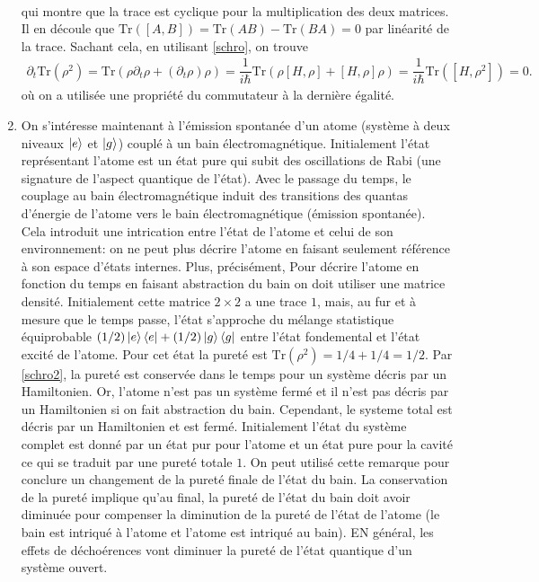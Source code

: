 \begin{enumerate}
\begin{align}
    \end{align}
    qui montre que la trace est cyclique pour la multiplication des deux matrices. Il en découle que $\text{Tr}([A, B]) = \text{Tr}(AB) - \text{Tr}(BA) = 0$ par linéarité de la trace. Sachant cela, en utilisant \eqref{schro}, on trouve 
    \begin{align}
         \partial_t \text{Tr}(\rho^2) = \text{Tr}\left(\rho \partial_t\rho + (\partial_t \rho) \rho\right)= \dfrac{1}{i\hbar}\text{Tr}\left(\rho[H, \rho]  + [H, \rho] \rho\right) = \dfrac{1}{i\hbar}\text{Tr}\left([H, \rho^2]\right) = 0. \label{schro2}
    \end{align}
    où on a utilisée une propriété du commutateur à la dernière égalité.
      
    \item On s'intéresse maintenant à l'émission spontanée d'un atome (système à deux niveaux $\ket{e}$ et $\ket{g}$) couplé à un bain électromagnétique. Initialement l'état représentant l'atome est un état pure qui subit des oscillations de Rabi (une signature de l'aspect quantique de l'état). Avec le passage du temps, le couplage au bain électromagnétique induit des transitions des quantas d'énergie de l'atome vers le bain électromagnétique (émission spontanée). Cela introduit une intrication entre l'état de l'atome et celui de son environnement: on ne peut plus décrire l'atome en faisant seulement référence à son espace d'états internes. Plus, précisément, Pour décrire l'atome en fonction du temps en faisant abstraction du bain on doit utiliser une matrice densité. Initialement cette matrice $2\times2$ a une trace $1$, mais, au fur et à mesure que le temps passe, l'état s'approche du mélange statistique équiprobable $(1/2)\ket{e}\bra{e}+(1/2)\ket{g}\bra{g}$ entre l'état fondemental et l'état excité de l'atome. Pour cet état la pureté est $\text{Tr}(\rho^2)=1/4 + 1/4 = 1/2$. Par \eqref{schro2}, la pureté est conservée dans le temps pour un système décris par un Hamiltonien. Or, l'atome n'est pas un système fermé et il n'est pas décris par un Hamiltonien si on fait abstraction du bain. Cependant, le systeme total est décris par un Hamiltonien et est fermé.  Initialement l'état du système complet est donné par un état pur pour l'atome et un état pure pour la cavité ce qui se traduit par une pureté totale $1$. On peut utilisé cette remarque pour conclure un changement de la pureté finale de l'état du bain. La conservation de la pureté implique qu'au final, la pureté de l'état du bain doit avoir diminuée pour compenser la diminution de la pureté de l'état de l'atome (le bain est intriqué à l'atome et l'atome est intriqué au bain). EN général, les effets de déchoérences vont diminuer la pureté de l'état quantique d'un système ouvert. 
\end{enumerate}